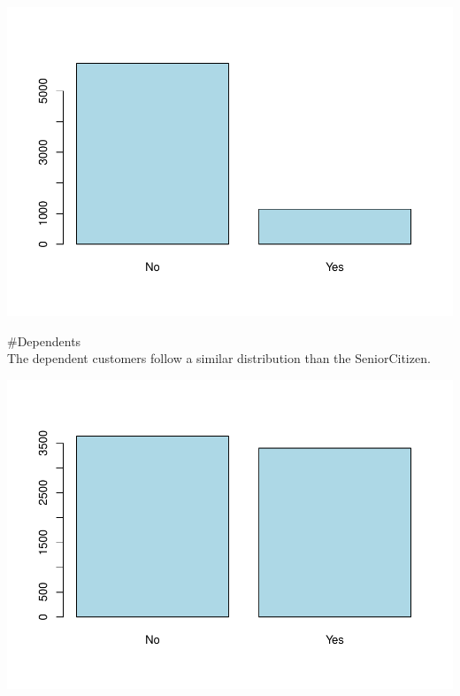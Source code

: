 \documentclass[
]{article}
\newenvironment{Shaded}{\begin{snugshade}}{\end{snugshade}}
\newcommand{\AttributeTok}[1]{\textcolor[rgb]{0.13,0.29,0.53}{#1}}
\newcommand{\CommentTok}[1]{\textcolor[rgb]{0.56,0.35,0.01}{\textit{#1}}}
\newcommand{\FunctionTok}[1]{\textcolor[rgb]{0.13,0.29,0.53}{\textbf{#1}}}
\newcommand{\NormalTok}[1]{#1}
\newcommand{\OtherTok}[1]{\textcolor[rgb]{0.56,0.35,0.01}{#1}}
\newcommand{\SpecialCharTok}[1]{\textcolor[rgb]{0.81,0.36,0.00}{\textbf{#1}}}
\newcommand{\StringTok}[1]{\textcolor[rgb]{0.31,0.60,0.02}{#1}}
\begin{document}
\includegraphics{Assignment2_script_files/figure-latex/unnamed-chunk-8-1.pdf}

\#Dependents\\
The dependent customers follow a similar distribution than the
SeniorCitizen.

\begin{Shaded}
\end{Shaded}

\includegraphics{Assignment2_script_files/figure-latex/unnamed-chunk-9-1.pdf}
\end{document}

